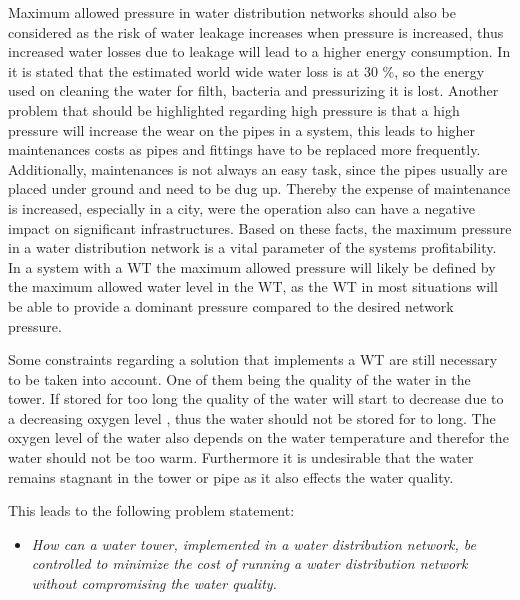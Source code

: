 Maximum allowed pressure in water distribution networks should also be considered as the risk of water leakage increases when pressure is increased\cite{feldman2009aspects}, thus increased water losses due to leakage will lead to a higher energy consumption. In \cite{feldman2009aspects} it is stated that the estimated world wide water loss is at 30 \%, so the energy used on cleaning the water for filth, bacteria and pressurizing it is lost. Another problem that should be highlighted regarding high pressure is that a high pressure will increase the wear on the pipes in a system\cite{Watts_water}, this leads to higher maintenances costs as pipes and fittings have to be replaced more frequently. Additionally, maintenances is not always an easy task, since the pipes usually are placed under ground and need to be dug up. Thereby the expense of maintenance is increased, especially in a city, were the operation also can have a negative impact on significant infrastructures. Based on these facts, the maximum pressure in a water distribution network is a vital parameter of the systems profitability. In a system with a WT the maximum allowed pressure will likely be defined by the maximum allowed water level in the WT, as the WT in most situations will be able to provide a dominant pressure compared to the desired network pressure.

Some constraints regarding a solution that implements a WT are still necessary to be taken into account. One of them being the quality of the water in the tower. If stored for too long the quality of the water will start to decrease due to a decreasing oxygen level \cite{Lenntech,DO}, thus the water should not be stored for to long. The oxygen level of the water also depends on the water temperature and therefor the water should not be too warm. Furthermore it is undesirable that the water remains stagnant in the tower or pipe as it also effects the water quality.

This leads to the following problem statement:
\begin{itemize}
\item \textit{How can a water tower, implemented in a water distribution network, be controlled to minimize the cost of running a water distribution network without compromising the water quality.}
\end{itemize} 


